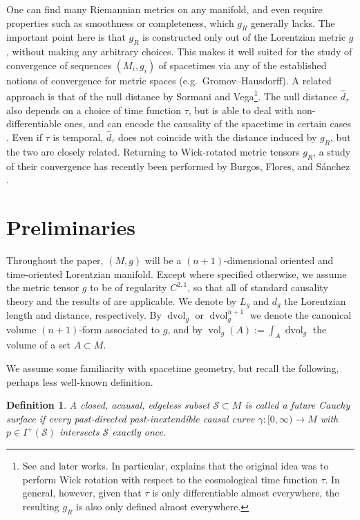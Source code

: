 \documentclass[a4paper,11pt]{amsart}
\newtheorem{definition}[theorem]{{Definition}}%
\newcommand{\vol}{\operatorname{dvol}_g}
\newcommand{\Vol}{\operatorname{vol}_g}
\newcommand{\CS}{\mathcal{S}}
\begin{document}
One can find many Riemannian metrics on any manifold, and even require properties such as smoothness or completeness, which $g_R$ generally lacks. The important point here is that $g_R$ is constructed only out of the Lorentzian metric $g$, without making any arbitrary choices. This makes it well suited for the study of convergence of sequences $(M_i,g_i)$ of spacetimes via any of the established notions of convergence for metric spaces (e.g.\ Gromov--Hausdorff). A related approach is that of the null distance by Sormani and Vega\footnote{See \cite{SoVe16} and later works. In particular, \cite[Rem.~2.15]{SaSo25} explains that the original idea was to perform Wick rotation with respect to the cosmological time function $\tau$. In general, however, given that $\tau$ is only differentiable almost everywhere, the resulting $g_R$ is also only defined almost everywhere.}. The null distance $\hat{d}_\tau$ also depends on a choice of time function $\tau$, but is able to deal with non-differentiable ones, and can encode the causality of the spacetime in certain cases \cite{SaSo23,BuGH24}. Even if $\tau$ is temporal, $\hat{d}_\tau$ does not coincide with the distance induced by $g_R$, but the two are closely related. Returning to Wick-rotated metric tensors $g_R$, a study of their convergence has recently been performed by Burgos, Flores, and S\'anchez \cite{BFS25}.


\section{Preliminaries}

Throughout the paper, $(M,g)$ will be a $(n+1)$-dimensional oriented and time-oriented Lorentzian manifold. Except where specified otherwise, we assume the metric tensor $g$ to be of regularity $C^{2,1}$, so that all of standard causality theory and the results of \cite{CGM16} are applicable. We denote by $L_g$ and $d_g$ the Lorentzian length and distance, respectively. By $\vol$ or $\vol^{n+1}$ we denote the canonical volume $(n+1)$-form associated to $g$, and by $\Vol(A) := \int_A \vol$ the volume of a set $A \subset M$.

We assume some familiarity with spacetime geometry, but recall the following, perhaps less well-known definition.

\begin{definition} \label{def:fCS}
    A closed, acausal, edgeless subset $\CS \subset M$ is called a \emph{future Cauchy surface} if every past-directed past-inextendible causal curve $\gamma \colon [0,\infty) \to M$ with $p \in I^+(\CS)$ intersects $\CS$ exactly once.
\end{definition}
\end{document}
